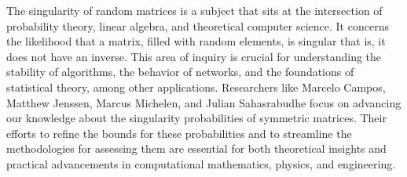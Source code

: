 The singularity of random matrices is a subject that sits at the intersection of probability theory, linear algebra, and theoretical computer science. It concerns the likelihood that a matrix, filled with random elements, is singular that is, it does not have an inverse. 
This area of inquiry is crucial for understanding the stability of algorithms, the behavior of networks, and the foundations of statistical theory, among other applications. 
Researchers like Marcelo Campos, Matthew Jenssen, Marcus Michelen, and Julian Sahasrabudhe focus on advancing our knowledge about the singularity probabilities of symmetric matrices. 
Their efforts to refine the bounds for these probabilities and to streamline the methodologies for assessing them are essential for both theoretical insights and practical advancements in computational mathematics, physics, and engineering.\\\\
